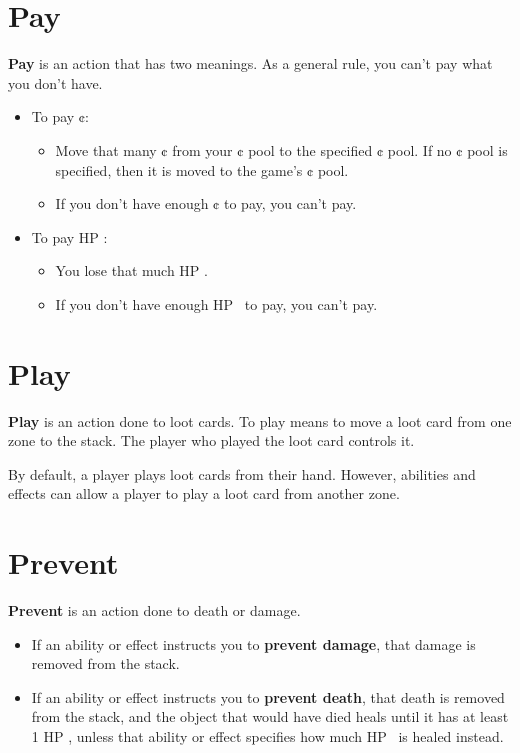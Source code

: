 \documentclass[
  fontsize=10pt,
  paper=a5,
  version=last,
  chapterprefix=true,
  bindingoffset=5mm,
  ]{scrbook}
\newcommand*{\inlineicon}[1]{%
    \raisebox{-.3\baselineskip}{%
        \smash{%
            \texttt{[image: \#1]}%
        }%
    }%
}
\newcommand{\heart}{\inlineicon{./assets/ms-heart.png}}
\begin{document}
    \section{Pay}
    \textbf{Pay} is an action that has two meanings. As a general rule, you can’t pay what you don’t have.
    \begin{itemize}
        \item To pay ¢:
        \begin{itemize}
            \item Move that many ¢ from your ¢ pool to the specified ¢ pool. If no ¢ pool is specified, then it is moved to the game’s ¢ pool.
            \item If you don’t have enough ¢ to pay, you can’t pay.
        \end{itemize}
        \item To pay HP\heart: 
        \begin{itemize}
            \item You lose that much HP\heart.
            \item If you don’t have enough HP\heart\ to pay, you can’t pay.
        \end{itemize}
    \end{itemize}
    \section{Play}
    \textbf{Play} is an action done to loot cards. To play means to move a loot card from one zone to the stack. The player who played the loot card controls it.

    By default, a player plays loot cards from their hand. However, abilities and effects can allow a player to play a loot card from another zone.
    \section{Prevent}
    \textbf{Prevent} is an action done to death or damage.

    \begin{itemize}
        \item If an ability or effect instructs you to \textbf{prevent damage}, that damage is removed from the stack.
        \item If an ability or effect instructs you to \textbf{prevent death}, that death is removed from the stack, and the object that would have died heals until it has at least 1 HP\heart, unless that ability or effect specifies how much HP\heart\ is healed instead.
    \end{itemize}
\end{document}
